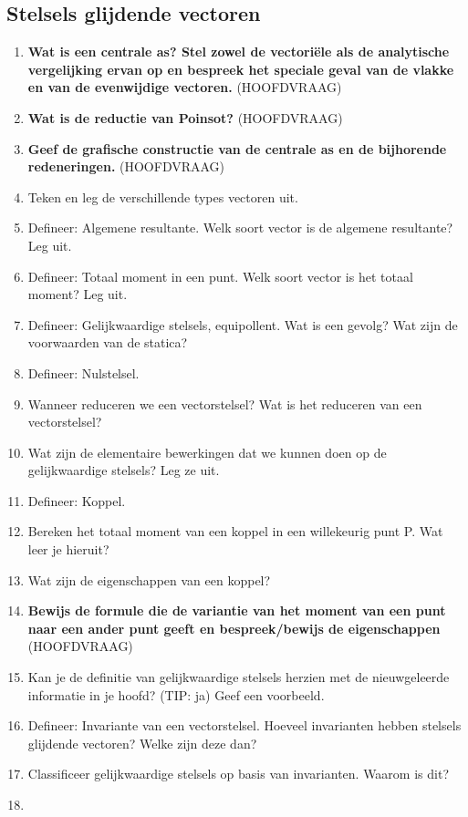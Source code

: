 \documentclass[a4paper,12pt]{article}
\begin{document}
    \subsection{Stelsels glijdende vectoren}
    \begin{enumerate}
        \item \textbf{Wat is een centrale as? Stel zowel de vectoriële als de analytische vergelijking ervan op en bespreek het speciale geval van de vlakke en van de evenwijdige vectoren.} (HOOFDVRAAG)
        \item \textbf{Wat is de reductie van Poinsot?} (HOOFDVRAAG)
        \item \textbf{Geef de grafische constructie van de centrale as en de bijhorende redeneringen.} (HOOFDVRAAG)
        \item Teken en leg de verschillende types vectoren uit.
        \item Defineer: Algemene resultante. Welk soort vector is de algemene resultante? Leg uit.
        \item Defineer: Totaal moment in een punt. Welk soort vector is het totaal moment? Leg uit.
        \item Defineer: Gelijkwaardige stelsels, equipollent. Wat is een gevolg? Wat zijn de voorwaarden van de statica?
        \item Defineer: Nulstelsel.
        \item Wanneer reduceren we een vectorstelsel? Wat is het reduceren van een vectorstelsel?
        \item Wat zijn de elementaire bewerkingen dat we kunnen doen op de gelijkwaardige stelsels? Leg ze uit.
        \item Defineer: Koppel.
        \item Bereken het totaal moment van een koppel in een willekeurig punt P. Wat leer je hieruit?
        \item Wat zijn de eigenschappen van een koppel?
        \item \textbf{Bewijs de formule die de variantie van het moment van een punt naar een ander punt geeft en bespreek/bewijs de eigenschappen} (HOOFDVRAAG)
        \item Kan je de definitie van gelijkwaardige stelsels herzien met de nieuwgeleerde informatie in je hoofd? (TIP: ja) Geef een voorbeeld.
        \item Defineer: Invariante van een vectorstelsel. Hoeveel invarianten hebben stelsels glijdende vectoren? Welke zijn deze dan?
        \item Classificeer gelijkwaardige stelsels op basis van invarianten. Waarom is dit?
        \item 
    \end{enumerate}
\end{document}
